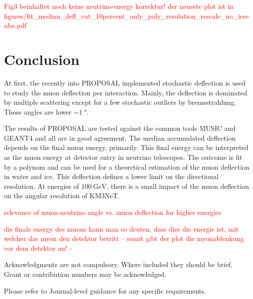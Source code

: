 \documentclass[pdflatex, sn-mathphys]{sn-jnl}%
\theoremstyle{thmstyleone}%
\theoremstyle{thmstyletwo}%
\theoremstyle{thmstylethree}%
\begin{document}
\textcolor{red}{Fig3 beinhaltet noch keine neutrino-energy korrektur! der neueste plot ist in figures/fit\_median\_defl\_cut\_10percent\_only\_poly\_resolution\_rescale\_no\_icecube.pdf}

\section{Conclusion}\label{sec:conclusion}

At first, the recently into PROPOSAL implemented stochastic deflection is 
used to study the muon deflection per interaction. Mainly, the deflection 
is dominated by multiple scattering except for a few stochastic 
outliers by bremsstrahlung. These angles are lower $\sim\SI{1}{\degree}$. 

The results of PROPOSAL are tested against the common tools MUSIC and 
GEANT4 and all are in good agreement.
The median accumulated deflection depends on the final muon energy, primarily. 
This final energy can be interpreted as the muon energy at detector entry 
in neutrino telescopes. 
The outcome is fit by a polynom and can be used for 
a theoretical estimation of the muon deflection in water and ice.
This deflection defines a lower limit on the directional resolution.
At energies of $\SI{100}{\giga\electronvolt}$, there is a small impact of the muon deflection on the angular 
resolution of KM3NeT.

\textcolor{red}{relevance of muon-neutrino angle vs. muon deflection for higher energies}

\textcolor{red}{die finale energy des muons kann man so deuten, dass dies die energie ist, mit welcher das myon den detektor betritt -- somit gibt der plot die myonablenkung vor dem detektor an! -}




\backmatter


Acknowledgments are not compulsory. Where included they should be brief. Grant or contribution numbers may be acknowledged.

Please refer to Journal-level guidance for any specific requirements.
\end{document}
